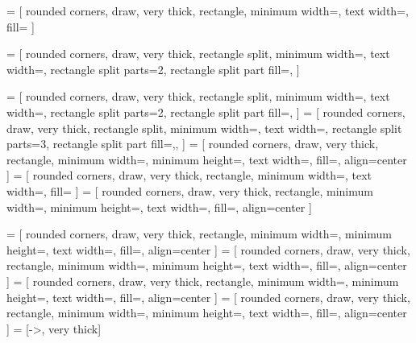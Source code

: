  = [
	rounded corners, draw, very thick, rectangle,
	minimum width=\nnboxminwidth, 
	text width=\nnboxtextwidth,
	fill=\densecolor
]

 = [
	rounded corners, draw, very thick, rectangle split,  
	minimum width=\nnboxminwidth, 
	text width=\nnboxtextwidth,
	rectangle split parts=2, 
	rectangle split part fill={\densecolor,\dropoutcolor}
]

 = [
	rounded corners, draw, very thick, rectangle split,
	minimum width=\nnboxminwidth, 
	text width=\nnboxtextwidth,
	rectangle split parts=2, 
	rectangle split part fill={\densecolor,\actcolor}
]
 = [
	rounded corners, draw, very thick, rectangle split,
	minimum width=\nnboxminwidth,
	text width=\nnboxtextwidth,
	rectangle split parts=3, 
	rectangle split part fill={\densecolor,\batchnormcolor,\dropoutcolor}
]
 = [
	rounded corners, draw, very thick, rectangle, 
	minimum width=\nnboxminwidth,
	minimum height=\nnboxminheight,
	text width=\nnboxtextwidth,
	fill=\subtractcolor,
	align=center
]
 = [
	rounded corners, draw, very thick, rectangle, 
	minimum width=\nnboxminwidth, 
	text width=\nnboxtextwidth,
	fill=\pcacolor
]
 = [
	rounded corners, draw, very thick, rectangle,
	minimum width=\nnboxminwidth, 
	minimum height=\nnboxminheight,
	text width=\nnboxtextwidth,
	fill=\classifiercolor,
	align=center
]

 = [
	rounded corners, draw, very thick, rectangle,
	minimum width=\nnboxminwidth, 
	minimum height=\nnboxminheight,
	text width=\nnboxtextwidth,
	fill=\fxcolor, 
	align=center
]
 = [
	rounded corners, draw, very thick, rectangle,
	minimum width=\nnboxminwidth, 
	minimum height=\nnboxminheight,
	text width=\nnboxtextwidth,
	fill=\combocolor,
	align=center
]
 = [
	rounded corners, draw, very thick, rectangle,
	minimum width=\nnboxminwidth, 
	minimum height=\nnboxminheight,
	text width=\nnboxtextwidth, 
	fill=\glasgowcolor,
	align=center
]
 = [
	rounded corners, draw, very thick, rectangle, 
	minimum width=\nnboxminwidth, 
	minimum height=\nnboxminheight,
	text width=\nnboxtextwidth, 
	fill=\resnetcolor,
	align=center
]
 = [->, very thick]

